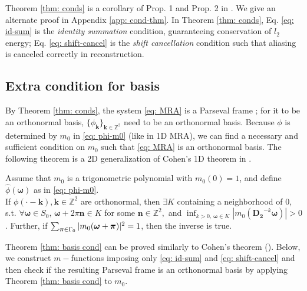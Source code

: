 Theorem \ref{thm: conds} is a corollary of Prop. 1 and Prop. 2 in \cite{durand2007}. We give an alternate proof in Appendix \ref{app: cond-thm}.
In Theorem \ref{thm: conds}, Eq. \eqref{eq: id-sum} is the {\it identity summation} condition, guaranteeing conservation of $l_2$ energy; Eq. \eqref{eq: shift-cancel} is the {\it shift cancellation} condition such that aliasing is canceled correctly in reconstruction. %

\subsection{Extra condition for basis}
By Theorem \ref{thm: conds}, the system \eqref{eq: MRA} is a Parseval frame ; for it to be an orthonormal basis,  $\{\phi_{\boldsymbol{k}}\}_{\boldsymbol{k}\in\mathbb{Z}^2}$ need to be an orthonormal basis. Because $\phi$ is determined by $m_0$ in \eqref{eq: phi-m0} (like in 1D MRA), we can find a necessary and sufficient condition on $m_0$ such that \eqref{eq: MRA} is an orthonormal basis. %
The following theorem is a 2D generalization of Cohen's 1D theorem in \cite{cohen1992biorthogonal}.
\begin{thm}\label{thm: basis cond}
Assume that $m_0$ is a trigonometric polynomial with $m_0(0)=1$, and define $\hat{\phi}(\boldsymbol{\omega})$ as in \eqref{eq: phi-m0}.\\
If $\phi(\cdot - \boldsymbol{k}),\boldsymbol{k}\in\mathbb{Z}^2$ are orthonormal, then $\exists K$ containing a neighborhood of 0, s.t. $\forall\boldsymbol{\omega}\in S_0,\,\boldsymbol{\omega}+2\pi\mathbf{n}\in K$ for some $\mathbf{n}\in\mathbb{Z}^2, $ and $\inf_{k>0,\,\boldsymbol{\omega}\in K}|m_0(\mathbf{D_2}^{-k}\boldsymbol{\omega})| >0$. 
 Further, if $\sum_{\boldsymbol{\boldsymbol{\pi}}\in \Gamma_0} |m_0(\boldsymbol{\omega}+\boldsymbol{\pi})|^2 = 1$, then the inverse is true.
\end{thm}
Theorem \ref{thm: basis cond} can be proved similarly to Cohen's theorem (\cite{cohen1992biorthogonal}).
Below, we construct $m-$functions imposing only \eqref{eq: id-sum} and \eqref{eq: shift-cancel} and then check if the resulting Parseval frame is an orthonormal basis by applying Theorem \ref{thm: basis cond} to $m_0$.

